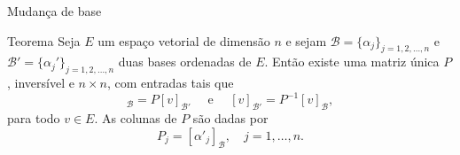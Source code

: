 \documentclass{beamer}
\begin{document}
\begin{darkframes}
\begin{frame}{Mudança de base}
  \begin{block}{Teorema}
    Seja $E$ um espaço vetorial de dimensão $n$ e sejam ${\mathcal{B}} =\{\alpha_j\}_{j=1,2,\ldots,n}$ e ${\mathcal{B}}'= \{\alpha_j'\}_{j=1,2,\ldots,n}$ duas bases ordenadas de $E$. Então existe uma matriz única $P$, inversível e $n\times n$, com entradas tais que
    \begin{equation*}
      [v]_{\mathcal{B}} = P[v]_{{\mathcal{B}}'} \quad \mbox{ e } \quad [v]_{{\mathcal{B}}'}=P^{-1}[v]_{\mathcal{B}},
    \end{equation*}
    para todo $v\in E$. As colunas de $P$ são dadas por 
    \begin{equation*}
      P_j = [\alpha'_j]_{\mathcal{B}}, \quad j = 1,\ldots,n.
    \end{equation*}
  \end{block}
\end{frame}


\end{darkframes}
\end{document}

